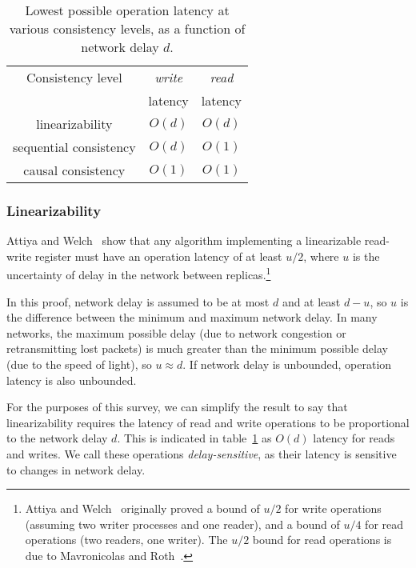 \documentclass[a4paper,twocolumn,10pt]{article}
\begin{document}
\begin{table}
    \centering
    \begin{tabular}{ccc}
        Consistency level      & \textit{write} & \textit{read} \\
                               & latency        & latency \\[3pt] \hline \noalign{\vspace{6pt}}
        linearizability        & $O(d)$         & $O(d)$  \\[3pt]
        sequential consistency & $O(d)$         & $O(1)$  \\[3pt]
        causal consistency     & $O(1)$         & $O(1)$  \\[3pt] \hline
    \end{tabular}
    \caption{Lowest possible operation latency at various consistency levels, as a function of
    network delay $d$.}
    \label{tab:op-latency}
\end{table}

\subsubsection{Linearizability}

Attiya and Welch~\cite{Attiya1994gw} show that any algorithm implementing a linearizable read-write
register must have an operation latency of at least $u/2$, where $u$ is the uncertainty of delay in
the network between replicas.\footnote{Attiya and Welch~\cite{Attiya1994gw} originally proved a
bound of $u/2$ for write operations (assuming two writer processes and one reader), and a bound of
$u/4$ for read operations (two readers, one writer). The $u/2$ bound for read operations is due to
Mavronicolas and Roth~\cite{Mavronicolas1999eb}.}

In this proof, network delay is assumed to be at most $d$ and at least $d-u$, so $u$ is the
difference between the minimum and maximum network delay. In many networks, the maximum possible
delay (due to network congestion or retransmitting lost packets) is much greater than the minimum
possible delay (due to the speed of light), so $u \approx d$. If network delay is unbounded,
operation latency is also unbounded.

For the purposes of this survey, we can simplify the result to say that linearizability requires the
latency of read and write operations to be proportional to the network delay $d$. This is indicated
in table~\ref{tab:op-latency} as $O(d)$ latency for reads and writes. We call these operations
\emph{delay-sensitive}, as their latency is sensitive to changes in network delay.
\end{document}
